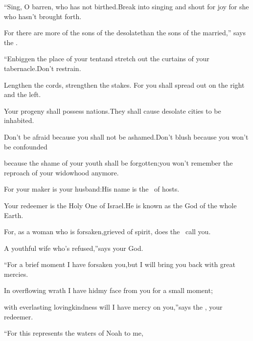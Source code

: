 
\begin{inparaenum}
  \pb{} ``Sing, O barren, who has not birthed.\pa{}Break into singing and shout for joy for she who hasn't brought forth.%

  \pc{}For there are more of the sons of the desolate\pa{}than the sons of the married,'' says the \lord.%

  \pb{} ``Enbiggen the place of your tent\pa{}and stretch out the curtains of your tabernacle.\pa{}Don't restrain.%

  \pc{}Lengthen the cords, strengthen the stakes.\pa{} For you shall spread out on the right and the left.%

  \pc{}Your progeny shall possess nations.\pa{}They shall cause desolate cities to be inhabited.%

  \pc{} Don't be afraid because you shall not be ashamed.\pa{}Don't blush because you won't be confounded%

  \pc{}because the shame of your youth shall be forgotten;\pa{}you won't remember the reproach of your widowhood anymore.%

  \pb{} For your maker is your husband:\pa{}His name is the \lord\ of hosts.%

  \pc{}Your redeemer is the Holy One of Israel.\pa{}He is known as the God of the whole Earth.%

  \pb{} For, as a woman who is forsaken,\pa{}grieved of spirit, does the \lord\ call you.%

  \pc{}A youthful wife who's refused,''\pa{}says your God.%

  \pb{} ``For a brief moment I have forsaken you,\pa{}but I will bring you back with great mercies.%

  \pb{} In overflowing wrath I have hid\pa{}my face from you for a small moment;%

  \pc{}with everlasting lovingkindness will I have mercy on you,''\pa{}says the \lord, your redeemer.%

  \pb{} ``For this represents the waters of Noah to me,%


\end{inparaenum}
